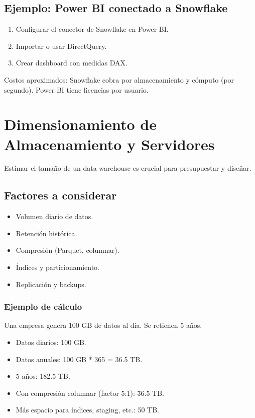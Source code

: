 \documentclass[12pt,a4paper,openany,oneside]{book}
\begin{document}
\section{Ejemplo: Power BI conectado a Snowflake}
\begin{enumerate}
    \item Configurar el conector de Snowflake en Power BI.
    \item Importar o usar DirectQuery.
    \item Crear dashboard con medidas DAX.
\end{enumerate}
Costos aproximados: Snowflake cobra por almacenamiento y cómputo (por segundo). Power BI tiene licencias por usuario.

\chapter{Dimensionamiento de Almacenamiento y Servidores}
Estimar el tamaño de un data warehouse es crucial para presupuestar y diseñar.

\section{Factores a considerar}
\begin{itemize}
    \item Volumen diario de datos.
    \item Retención histórica.
    \item Compresión (Parquet, columnar).
    \item Índices y particionamiento.
    \item Replicación y backups.
\end{itemize}

\subsection{Ejemplo de cálculo}
Una empresa genera 100 GB de datos al día. Se retienen 5 años.
\begin{itemize}
    \item Datos diarios: 100 GB.
    \item Datos anuales: 100 GB * 365 = 36.5 TB.
    \item 5 años: 182.5 TB.
    \item Con compresión columnar (factor 5:1): \~36.5 TB.
    \item Más espacio para índices, staging, etc.: 50 TB.
\end{itemize}
\end{document}
